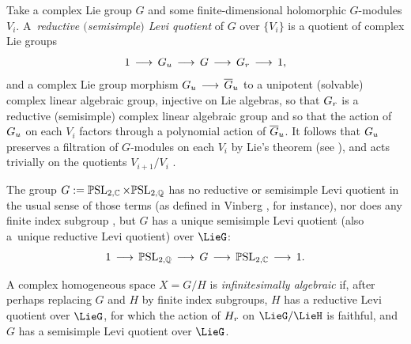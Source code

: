 \documentclass[11pt]{article}
\numberwithin{equation}{section}
\providecommand{\C}{\mathbb{C}}
\numberwithin{equation}{section}
\renewcommand{\C}{\mathbb{C}}
\newcommand{\Q}{\mathbb{Q}}
\begin{document}
Take a complex Lie group $G$ and some finite-dimensional holomorphic $G$-modules $V_i$.
A~\emph{reductive $($semisimple$)$ Levi quotient} of $G$ over $\{V_i\}$ is a quotient of complex Lie groups
\[
1 \to \urad{G} \to G \to \red{G} \to 1,
\]
and a complex Lie group morphism $\urad{G} \to \urad{\overline{G}}$ to a unipotent (solvable) complex
linear algebraic group, injective on Lie algebras, so that $\red{G}$ is a reductive (semisimple) complex
linear algebraic group and so that the action of $\urad{G}$ on each $V_i$ factors through a polynomial
action of $\urad{\overline{G}}$.
It follows that $\urad{G}$ preserves a filtration of $G$-modules on each $V_i$ by Lie's theorem
(see \cite[Theorem~3]{Serre:2001}), and acts trivially on the quotients $V_{i+1}/V_i$
\cite[Section 4.8]{Borel:1991}.
\begin{Example}

The group $G := \PSL{2,\C} \times \PSL{2,\Q{}}$ has no reductive or semisimple Levi quotient in the
usual sense of those terms (as defined in Vinberg \cite[p.~20]{Vinberg:1994}, for instance), nor does any finite index
subgroup \cite[Theorem 6.14]{Jacobson:1985}, but $G$ has a unique semisimple Levi quotient (also a~unique reductive Levi quotient) over $\LieG$:
\[
1 \to \PSL{2,\Q{}} \to G \to \PSL{2,\C} \to 1.
\]
\end{Example}
A complex homogeneous space $X=G/H$ is \emph{infinitesimally algebraic} if, after perhaps replacing $G$ and $H$ by finite index subgroups, $H$ has a reductive Levi quotient over $\LieG$, for which the action of $\red{H}$ on $\LieG/\LieH$ is faithful, and $G$ has a semisimple Levi quotient over $\LieG$.
\end{document}
